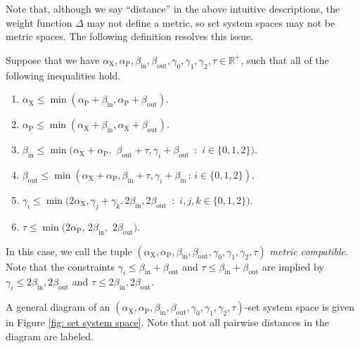\documentclass{article}\providecommand{\DeclareRedundantLanguages}[2]{}\usepackage[a4paper,margin=20mm]{geometry}
\newcommand{\R}{\mathbb{R}}
\newcommand{\1}{\textbf{1}}
\newcommand{\td}{\tau}
\newcommand{\srd}{\alpha_{\text{X}}}
\newcommand{\trd}{\alpha_{\text{P}}}
\begin{document}
Note that, although we say ``distance'' in the above intuitive descriptions, the weight function $\Delta$ may not define a metric, so set system spaces may not be metric spaces. The following definition resolves this issue.

\begin{definition} \label{defn: metric compat}
 Suppose that we have $\srd, \trd, \beta_{\text{in}}, \beta_{\text{out}}, \gamma_0, \gamma_1, \gamma_2, \td \in \R^+$, such that all of the following inequalities hold.
\begin{enumerate}
    \item $\srd \leq \min(\trd + \beta_{\text{in}},\trd + \beta_{\text{out}})$.
    \item $\trd \leq \min(\srd + \beta_{\text{in}}, \srd + \beta_{\text{out}}).$
    \item $\beta_{\text{in}} \leq  \min(\srd + \trd,$ $\beta_{\text{out}} + \td, \gamma_i + \beta_{\text{out}}$ \,:\, $i \in \{0,1,2\})$.
    \item $\beta_{\text{out}} \leq \min(\srd + \trd, \beta_{\text{in}} + \td, \gamma_i + \beta_{\text{in}} \,:\, i \in \{0,1,2\})$.
    \item $\gamma_i \leq \min(2 \srd, \gamma_j + \gamma_k, 2\beta_{\text{in}}, 2\beta_{\text{out}}$ \,:\, $i,j,k \in \{0,1,2\})$.
    \item $\td \leq \min(2 \trd$, $2\beta_{\text{in}},$ $2\beta_{\text{out}})$.
\end{enumerate}
In this case, we call the tuple $(\srd, \trd, \beta_{\text{in}}, \beta_{\text{out}}, \gamma_0, \gamma_1, \gamma_2, \td)$ \textit{metric compatible}. Note that the constraints $\gamma_i \leq \beta_{\text{in}} + \beta_{\text{out}}$ and $\td \leq \beta_{\text{in}} + \beta_{\text{out}}$ are implied by $\gamma_i \leq 2\beta_{\text{in}},  2\beta_{\text{out}}$ and $\td \leq 2\beta_{\text{in}}, 2\beta_{\text{out}}$. 
\end{definition}

A general diagram of an $(\srd, \trd, \beta_{\text{in}}, \beta_{\text{out}}, \gamma_0, \gamma_1, \gamma_2, \td)$-set system space is given in Figure \ref{fig: set system space}. Note that not all pairwise distances in the diagram are labeled. 
\end{document}
